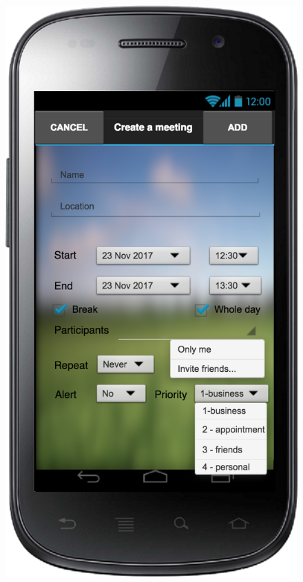 \documentclass[a4paper,leqno]{article}
\begin{document}
\newpage
\begin{figure}
	\begin{minipage}[!h]{0.45\linewidth}
		\centering
		\includegraphics[scale=0.15]{createMeeting}
	\end{minipage}
	\hspace{0.5cm}

\end{figure}
\end{document}
